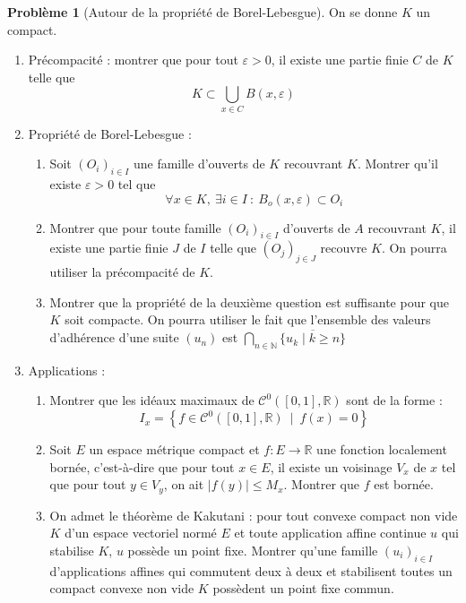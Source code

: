 \documentclass[french]{book}
\newcommand{\N}{\mathbb{N}}
\newcommand{\R}{\mathbb{R}}
\theoremstyle{definition}
\newtheorem{pro}{Problème}[chapter]
\begin{document}
\begin{pro}[Autour de la propriété de Borel-Lebesgue]
	On se donne $K$ un compact.
	\begin{enumerate}
		\item  Précompacité : montrer que pour tout $\varepsilon>0$, il existe une partie finie $C$ de $K$ telle que $$K\subset\bigcup_{x\in C}B(x,\varepsilon)$$
		\item Propriété de Borel-Lebesgue :
		\begin{enumerate}[label=\alph*.]
			\item Soit $(O_i)_{i\in I}$ une famille d'ouverts de $K$ recouvrant $K$. Montrer qu'il existe $\varepsilon>0$ tel que $$\forall x\in K,\ \exists i\in I\ : \ B_o(x,\varepsilon)\subset O_i$$
			\item Montrer que pour toute famille $(O_i)_{i\in I}$ d'ouverts de $A$ recouvrant $K$, il existe une partie finie $J$ de $I$ telle que $(O_j)_{j\in J}$ recouvre $K$. On pourra utiliser la précompacité de $K$.
			\item Montrer que la propriété de la deuxième question est suffisante pour que $K$ soit compacte. On pourra utiliser le fait que l'ensemble des valeurs d'adhérence d'une suite $(u_n)$ est $\displaystyle\bigcap_{n\in\N}\overline{\{u_k\mid k\geqslant n\}}$
		\end{enumerate}
		\item Applications :
		\begin{enumerate}[label=\alph*.]
			\item Montrer que les idéaux maximaux de $\mathcal{C}^0([0,1],\R)$ sont de la forme : $$I_x=\left\{f\in\mathcal{C}^0([0,1],\R)\ \mid\ f(x)=0\right\}$$
			\item Soit $E$ un espace métrique compact et $f:E\to\R$ une fonction localement bornée, c'est-à-dire que pour tout $x\in E$, il existe un voisinage $V_x$ de $x$ tel que pour tout $y\in V_y$, on ait $\lvert f(y)\rvert\leqslant M_x$. Montrer que $f$ est bornée.
			\item On admet le théorème de Kakutani : pour tout convexe compact non vide $K$ d'un espace vectoriel normé $E$ et toute application affine continue $u$ qui stabilise $K$, $u$ possède un point fixe. Montrer qu'une famille $(u_i)_{i\in I}$ d'applications affines qui commutent deux à deux et stabilisent toutes un compact convexe non vide $K$ possèdent un point fixe commun.
		\end{enumerate}
	\end{enumerate}
\end{pro}
\end{document}
